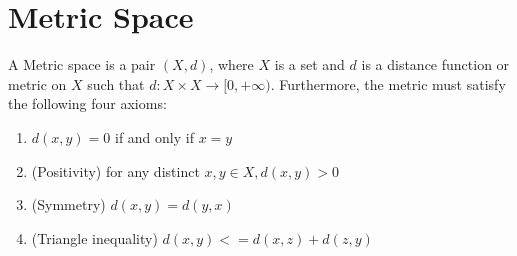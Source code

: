 \chapter{Metric Space}

\begin{definition}
A Metric space is a pair $(X, d)$, where $X$ is a set and $d$ is a distance function or metric on $X$ such that $d: X\times X \to [0, +\infty)$.
Furthermore, the metric must satisfy the following four axioms:
\begin{enumerate}[label=(\alph*)]
\item  $d(x, y) = 0$ if and only if $x = y$
\item  (Positivity) for any distinct $x, y \in X, d(x, y) > 0$ 
\item  (Symmetry) $d(x, y) = d(y, x)$ 
\item  (Triangle inequality) $d(x, y) <= d(x, z) + d(z, y)$ 
\end{enumerate}
\end{definition}